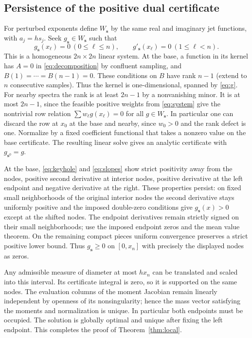 \documentclass[11pt]{article}
\theoremstyle{remark}\newtheorem{remark}[theorem]{Remark}
\begin{document}
\subsection{Persistence of the positive dual certificate}
For perturbed exponents define $W_{\boldsymbol{s}}$ by the same real and imaginary jet functions, with $a_j=hs_j$. Seek $g_{\boldsymbol{s}}\in W_{\boldsymbol{s}}$ such that
\begin{equation}\label{eq:dualconds}
 g_{\boldsymbol{s}}(x_\ell)=0\ (0\le\ell\le n),\qquad
 g'_{\boldsymbol{s}}(x_\ell)=0\ (1\le\ell<n).
\end{equation}
This is a homogeneous $2n\times 2n$ linear system. At the base, a function in its kernel has $A=0$ in \eqref{eq:decomposition} by confluent sampling, and $B(1)=\cdots=B(n-1)=0$. These conditions on $B$ have rank $n-1$ (extend to $n$ consecutive samples). Thus the kernel is one-dimensional, spanned by \eqref{eq:g}. For nearby spectra the rank is at least $2n-1$ by a nonvanishing minor. It is at most $2n-1$, since the feasible positive weights from \eqref{eq:system} give the nontrivial row relation $\sum w_\ell g(x_\ell)=0$ for all $g\in W_{\boldsymbol{s}}$. In particular one can discard the row at $x_0$ at the base and nearby, since $w_0>0$ and the rank defect is one. Normalize by a fixed coefficient functional that takes a nonzero value on the base certificate. The resulting linear solve gives an analytic certificate with $g_{\boldsymbol{s}^0}=g$.

At the base, \eqref{eq:keyhole} and \eqref{eq:slopes} show strict positivity away from the nodes, positive second derivative at interior nodes, positive derivative at the left endpoint and negative derivative at the right. These properties persist: on fixed small neighborhoods of the original interior nodes the second derivative stays uniformly positive and the imposed double-zero conditions give $g_{\boldsymbol{s}}(x)>0$ except at the shifted nodes. The endpoint derivatives remain strictly signed on their small neighborhoods; use the imposed endpoint zeros and the mean value theorem. On the remaining compact pieces uniform convergence preserves a strict positive lower bound. Thus $g_{\boldsymbol{s}}\ge0$ on $[0,x_n]$ with precisely the displayed nodes as zeros.

Any admissible measure of diameter at most $h x_n$ can be translated and scaled into this interval. Its certificate integral is zero, so it is supported on the same nodes. The evaluation columns of the moment Jacobian remain linearly independent by openness of its nonsingularity; hence the mass vector satisfying the moments and normalization is unique. In particular both endpoints must be occupied. The solution is globally optimal and unique after fixing the left endpoint. This completes the proof of Theorem~\ref{thm:local}.
\end{document}
